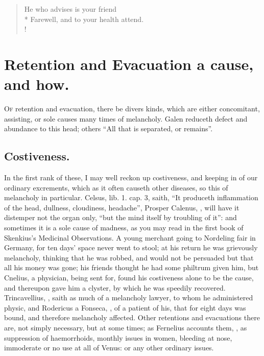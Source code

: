 \begin{verse}%
He who advises is your friend\\*
Farewell, and to your health attend.\\!
\end{verse}%

\section{Retention and Evacuation a cause, and how.}

\lettrine{O}{f} retention and evacuation, there be divers kinds, which are
either concomitant, assisting, or sole causes many times of melancholy.
Galen reduceth defect and abundance to this head; others
\enquote{All that is separated, or remains}.

\subsection{Costiveness.}

In the first rank of these, I may well reckon up costiveness, and keeping in of
our ordinary excrements, which as it often causeth other diseases, so this of
melancholy in particular. Celsus, lib. 1. cap. 3, saith,
\enquote{It produceth inflammation of the head, dullness, cloudiness, headache}, \etc{}
Prosper Calenus, , will have it
distemper not the organ only, \enquote{but the mind itself by
troubling of it}: and sometimes it is a sole cause of madness, as you may read
in the first book of Skenkius's Medicinal Observations. A
young merchant going to Nordeling fair in Germany, for ten days' space never
went to stool; at his return he was grievously melancholy,
thinking that he was robbed, and would not be persuaded but that all his money
was gone; his friends thought he had some philtrum given him, but Cnelius, a
physician, being sent for, found his costiveness alone to
be the cause, and thereupon gave him a clyster, by which he was speedily
recovered. Trincavellius, , saith as
much of a melancholy lawyer, to whom he administered physic, and Rodericus a
Fonseca, , of a
patient of his, that for eight days was bound, and therefore melancholy
affected. Other retentions and evacuations there are, not simply necessary, but
at some times; as Fernelius accounts them, , as suppression of haemorrhoids, monthly issues in women, bleeding at
nose, immoderate or no use at all of Venus: or any other ordinary issues.

